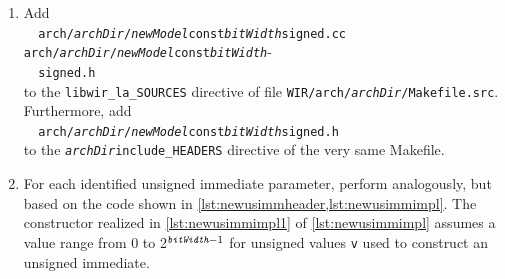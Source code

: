 \begin{enumerate}[resume]
\begin{lstlisting}[style=code,float=!t,caption={Implementation of a New Signed Immediate Parameter's Class},label=lst:newsimmimpl]
// Move constructor.
Ü{\itshape newModel}Ü_ConstÜ{\itshape bitWidth}Ü_Signed::Ü{\itshape newModel}Ü_ConstÜ{\itshape bitWidth}Ü_Signed@(@ Ü{\itshape newModel}Ü_ConstÜ{\itshape bitWidth}Ü_Signed æ&&æo @) :@ WIR_SignedImmediateParameteræ<æÜ{\itshape newModel}Ü_ConstÜ{\itshape bitWidth}Ü_Signedæ>æ { ästd::moveä@(@ o @)@ }Ü\label{lst:newsimmimpl3}Ü
{};

// Destructor.
Ü{\itshape newModel}Ü_ConstÜ{\itshape bitWidth}Ü_Signed::~Ü{\itshape newModel}Ü_ConstÜ{\itshape bitWidth}Ü_Signed@( void )@Ü\label{lst:newsimmimpl4}Ü
{};

// Copy-assignment operator.
Ü{\itshape newModel}Ü_ConstÜ{\itshape bitWidth}Ü_Signed æ&æ Ü{\itshape newModel}Ü_ConstÜ{\itshape bitWidth}Ü_Signed::operator æ=æ @(@ const Ü{\itshape newModel}Ü_ConstÜ{\itshape bitWidth}Ü_Signed æ&æo @)@Ü\label{lst:newsimmimpl5}Ü
{
  WIR_SignedImmediateParameteræ<æÜ{\itshape newModel}Ü_ConstÜ{\itshape bitWidth}Ü_Signedæ>æ::operator æ=æ @(@ o @)@;
  return@(@ *this @)@;
};

// Move-assignment operator.
Ü{\itshape newModel}Ü_ConstÜ{\itshape bitWidth}Ü_Signed æ&æ Ü{\itshape newModel}Ü_ConstÜ{\itshape bitWidth}Ü_Signed::operator æ=æ @(@ Ü{\itshape newModel}Ü_ConstÜ{\itshape bitWidth}Ü_Signed æ&&æo @)@Ü\label{lst:newsimmimpl6}Ü
{
  WIR_SignedImmediateParameteræ<æÜ{\itshape newModel}Ü_ConstÜ{\itshape bitWidth}Ü_Signedæ>æ::operator æ=æ @(@ ästd::moveä@(@ o @) )@;
  return@(@ *this @)@;
};

}       // namespace WIR
\end{lstlisting}

  \item Add\label{enum:newsimmmake} \\
  \verb|  arch/|\texttt{\itshape archDir}\verb|/|\texttt{\itshape newModel}\verb|const|\texttt{\itshape bitWidth}\verb|signed.cc arch/|\texttt{\itshape archDir}\verb|/|\texttt{\itshape newModel}\verb|const|\texttt{\itshape bitWidth}-\\
  \verb|  signed.h| \\
  to the \texttt{libwir\_la\_SOURCES} directive of file \texttt{WIR/arch/{\itshape archDir}/Makefile.src}.
  Furthermore, add \\
  \verb|  arch/|\texttt{\itshape archDir}\verb|/|\texttt{\itshape newModel}\verb|const|\texttt{\itshape bitWidth}\verb|signed.h| \\
  to the \texttt{{\itshape archDir}include\_HEADERS} directive of the very same Makefile.

  \item For each identified unsigned immediate parameter, perform  analogously, but based on the code shown in \cref{lst:newusimmheader,lst:newusimmimpl}.
  The constructor realized in \cref{lst:newusimmimpl1} of \cref{lst:newusimmimpl} assumes a value range from 0 to 2$^{\texttt{\itshape bitWidth}-1}$ for unsigned values \texttt{v} used to construct an unsigned immediate.


\end{enumerate}
